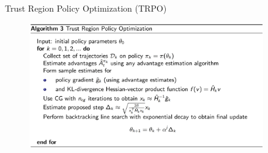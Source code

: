 \begin{frame}{Trust Region Policy Optimization (TRPO)}
\begin{figure}
\centering
\includegraphics[width=0.9\textwidth,height=0.9\textheight,keepaspectratio]{images/policy-search/trpo_2.png}
\end{figure}
    
\end{frame}